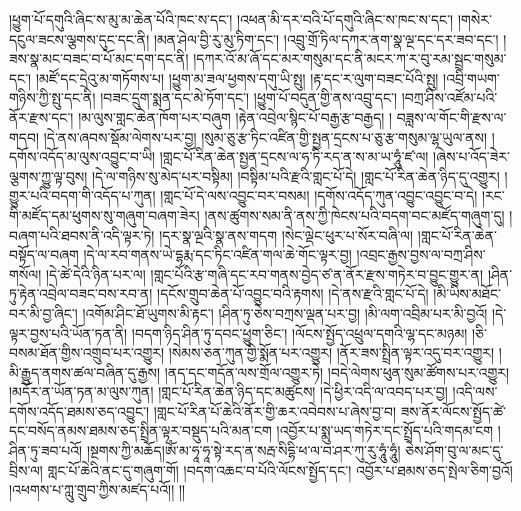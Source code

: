 །ཕྱུག་པོ་དགུའི་ཞིང་ས་མུ་མ་ཆེན་པོའི་ཁང་ས་དང་། །འཕན་མི་དར་བའི་པོ་དགུའི་ཞིང་ས་ཁང་ས་དང་། །གསེར་དངུལ་ཟངས་ལྕགས་དུང་དང་ནི། །མན་ཤེལ་བྱི་རུ་མུ་ཏིག་དང་། །འབྲུ་གྲོ་ཏིལ་དཀར་ནག་སྣ་ལྔ་དང་དར་ཟབ་དང་། །ཟས་སྣ་མང་བཟང་བ་པོ་མང་དག་དང་ནི། །དཀར་འོ་མ་ཞོ་དང་མར་གསུམ་དང་ནི་མངར་ཀ་ར་བུ་རམ་སྦྲང་གསུམ་དང་། །མཛོ་དང་དྲེའུ་མ་གཏོགས་པ། །ཕྱུག་མ་ཟལ་ཕྱགས་དགུ་ཡི་སྤུ། །རྟ་དང་ར་ལུག་བཟང་པོའི་སྤུ། །འབྲི་གཡག་གཉིས་ཀྱི་སྤུ་དང་ནི། །བཟང་དྲུག་སྨན་དང་མེ་ཏོག་དང་། །ཕྱུག་པོ་བདུན་གྱི་ནས་འབྲུ་དང་། །བཀྲ་ཤིས་འཛོམ་པའི་ནོར་རྫས་དང་། །མ་ལུས་གླང་ཆེན་ཁོག་པར་བཞུག །རྟེན་འབྲེལ་སྙིང་པོ་བརྒྱ་རྩ་བརྒྱད། །
བཟླས་ལ་གོང་གི་རྫས་ལ་གདབ། །དེ་ནས་ཞབས་སྡོམ་ལེགས་པར་བྱ། །སུམ་ཅུ་རྩ་ཏིང་འཛིན་གྱི་སྤྱན་དྲངས་པ་ཅུ་རྩ་གསུམ་ལྷ་ཡུལ་ནས། །དགོས་འདོད་མ་ལུས་འབྱུང་བ་ཡི། །གླང་པོ་རིན་ཆེན་སྤྱན་དྲངས་ལ་ཧ་ཏི་རད་ན་ས་མ་ཡ་ཧཱུཾ་ཛ་ལ། །ཞེས་པ་འོད་ཟེར་ལྕགས་ཀྱུ་ལྟ་བུས། །དེ་ལ་གཉིས་སུ་མེད་པར་བསྟིམ། །བསྟིམ་པའི་རྫའི་གླང་པོ་དེ། །གླང་པོ་རིན་ཆེན་ཉིད་དུ་འགྱུར། །གྱུར་པའི་བདག་གི་འདོད་པ་ཀུན། །གླང་པོ་དེ་ལས་འབྱུང་བར་བསམ། །དགོས་འདོད་ཀུན་འབྱུང་འབྱུང་བ་དེ། །རང་གི་མཛོད་དམ་ཕུགས་སུ་གཞུག་བཞག་ཟེར། །ནས་ཚུགས་སམ་ནི་ནས་ཀྱི་ཁེངས་པའི་བདག་བང་མཛོད་གཞུག་དུ། །བཞག་པའི་ཐབས་ནི་འདི་ལྟར་ཏེ། །དར་སྣ་ལྔའི་སྣ་ནས་གདག །སེང་ལྡེང་ཕུར་པ་སོར་བཞི་ལ། །གླང་པོ་རིན་ཆེན་བསྟོད་ལ་བཞག །དེ་ལ་རབ་གནས་ཡེ་དྷརྨ་དང་ཏིང་འཛིན་གལ་ཆེ་གོང་ལྟར་བྱ། །འབྲང་རྒྱས་བྱས་ལ་བཀྲ་ཤིས་གསོལ། །དེ་ཚེ་དེའི་ཉིན་པར་ལ། །གླང་པོའི་རྩ་གཞི་དང་རབ་གནས་བྱེད་ཙ་ན་ནོར་རྫས་གཏེར་བ་བྱུང་གྱུར་ན། །ཤིན་ཏུ་རྟེན་འབྲེལ་བཟང་བས་རབ་ན། །དངོས་གྲུབ་ཆེན་པོ་འབྱུང་བའི་རྟགས། །དེ་ནས་རྫའི་གླང་པོ་དེ། །མི་ཡིས་མཐོང་བར་མི་བྱ་ཞིང་། །འགོམ་ཤིང་ཐོ་ཡུགས་མི་རྟང་། །ཤིན་ཏུ་ཅེས་བཀྲས་ལྡན་པར་བྱ། །མི་ལག་འབྲིམ་པར་མི་བྱའོ། །དེ་ལྟར་བྱས་པའི་ཡོན་ཏན་ནི། །བདག་ཉིད་ཤིན་ཏུ་དབང་ཕྱུག་ཅིང་། །ལོངས་སྤྱོད་འཕྲུལ་དགའི་ལྷ་དང་མཉམ། །ཅི་བསམ་ཐོན་གྱིས་འགྲུབ་པར་འགྱུར། །སེམས་ཅན་ཀུན་གྱི་སྨོན་པར་འགྱུར། །ནོར་ཟས་སྤྲིན་ལྟར་འདུ་བར་འགྱུར། །མི་རྒྱུད་ནགས་ཚལ་བཞིན་དུ་རྒྱས། །ནད་དང་གདོན་ལས་གྲོལ་འགྱུར་ཏེ། །བདེ་ལེགས་ཕུན་སུམ་ཚོགས་པར་འགྱུར། །མདོར་ན་ཡོན་ཏན་མ་ལུས་ཀུན། །གླང་པོ་རིན་ཆེན་ཉིད་དང་མཚུངས། །དེ་ཕྱིར་འདི་ལ་འབད་པར་བྱ། །འདི་ལས་དགོས་འདོད་ཐམས་ཅད་འབྱུང་། །གླང་པོ་རིན་པོ་ཆེའི་ནོར་གྱི་ཆར་འབེབས་པ་ཞེས་བྱ་བ། ཟས་ནོར་ལོངས་སྤྱོད་ཚེ་དང་བསོད་ནམས་ཐམས་ཅད་སྤྲིན་ལྟར་བསྡུད་པའི་མན་ངག །འབྱོར་པ་སྨུ་ཡད་གཏེར་དང་སྤྲོད་པའི་གདམ་ངག །ཤིན་ཏུ་ཟབ་པའོ། །སྔགས་ཀྱི་མཆོད།ཨོཾ་མ་ཧཱ་ཧཱ་སྟེ་རད་ན་སརྦ་སིདྷི་ཕ་ལ་བ་ཤར་ཀུ་རུ་ཧཱུཾ་ཧཱུཾ། ཅེས་ཤོག་བུ་ལ་མང་དུ་བྲིས་ལ། གླང་པོ་ཆེའི་ནང་དུ་གཞུག་གོ། །བདག་འཆང་བ་པོའི་ལོངས་སྤྱོད་དང་། འབྱོར་པ་ཐམས་ཅད་སྤེལ་ཅིག་བྱའོ། །འཕགས་པ་ཀླུ་གྲུབ་ཀྱིས་མཛད་པའོ།། །།